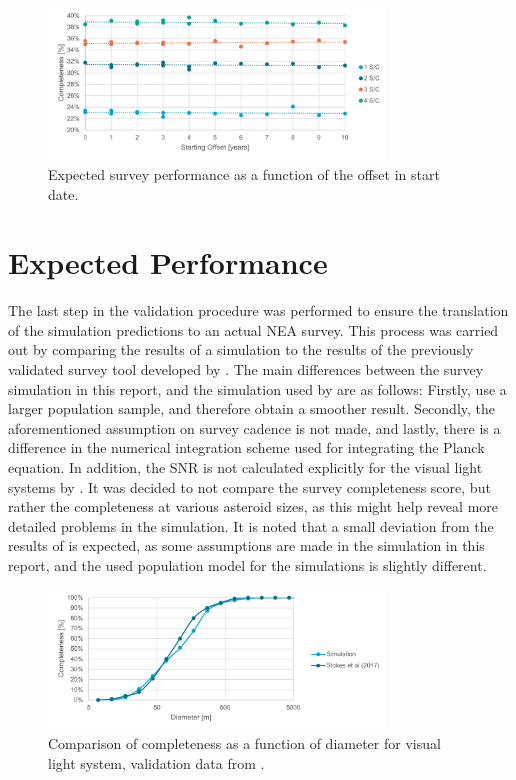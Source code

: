 \begin{figure}[htbp]
 \centering
 \includegraphics[width=0.8\textwidth]{img/validation_starting_year.pdf}
 \caption{Expected survey performance as a function of the offset in start date.}
 \label{fig:validation_starting_year}
\end{figure}



\section{Expected Performance}
\label{sec:vvperformance}

The last step in the validation procedure was performed to ensure the translation of the simulation predictions to an actual NEA survey. This process was carried out by comparing the results of a simulation to the results of the previously validated survey tool developed by \cite{2017NEOSDT}. The main differences between the survey simulation in this report, and the simulation used by \cite{2017NEOSDT} are as follows: Firstly, \cite{2017NEOSDT} use a larger population sample, and therefore obtain a smoother result. Secondly, the aforementioned assumption on survey cadence is not made, and lastly, there is a difference in the numerical integration scheme used for integrating the Planck equation. In addition, the SNR is not calculated explicitly for the visual light systems by \cite{2017NEOSDT}. It was decided to not compare the survey completeness score, but rather the completeness at various asteroid sizes, as this might help reveal more detailed problems in the simulation. It is noted that a small deviation from the results of \cite{2017NEOSDT} is expected, as some assumptions are made in the simulation in this report, and the used population model for the simulations is slightly different.

\begin{figure}[htbp]
 \centering
 \includegraphics[width=0.8\textwidth]{img/validation_completeness_vis.pdf}
 \caption{Comparison of completeness as a function of diameter for visual light system, validation data from \cite{2017NEOSDT}.}
 \label{fig:validation_completeness_vis}
\end{figure}


